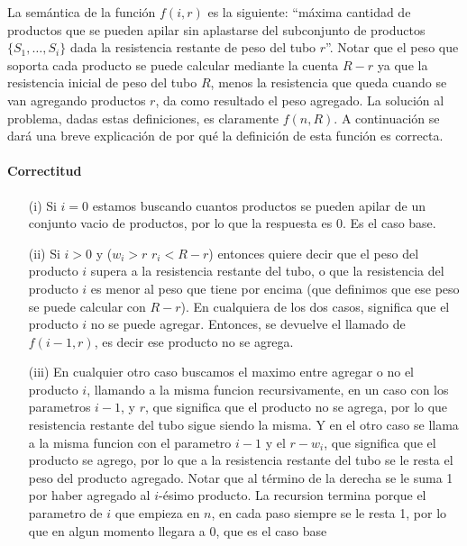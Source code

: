 \documentclass[10pt,a4paper]{article}
\begin{document}
La semántica de la función $f(i, r)$ es la siguiente: ``máxima cantidad de productos que se pueden apilar sin aplastarse del subconjunto de productos $\{S_1, \hdots, S_i\}$ dada la resistencia restante de peso del tubo $r$''. Notar que el peso que soporta cada producto se puede calcular mediante la cuenta $R-r$ ya que la resistencia inicial de peso del tubo $R$, menos la resistencia que queda cuando se van agregando productos $r$, da como resultado el peso agregado. La solución al problema, dadas estas definiciones, es claramente $f(n, R)$. A continuación se dará una breve explicación de por qué la definición de esta función es correcta.

\paragraph{Correctitud}
\begin{enumerate}
    \item[(i)] {Si $i = 0$ estamos buscando cuantos productos se pueden apilar de un conjunto vacio de productos, por lo que la respuesta es 0. Es el caso base.}
    \item[(ii)] {Si $i > 0$ y ($w_i > r$ \lor $r_i < R - r$) entonces quiere decir que el peso del producto $i$ supera a la resistencia restante del tubo, o que la resistencia del producto $i$ es menor al peso que tiene por encima (que definimos que ese peso se puede calcular con $R - r$). En cualquiera de los dos casos, significa que el producto $i$ no se puede agregar. Entonces, se devuelve el llamado de $f(i-1,r)$, es decir ese producto no se agrega.}
    \item[(iii)] { En cualquier otro caso buscamos el maximo entre agregar o no el producto $i$, llamando a la misma funcion recursivamente, en un caso con los parametros $i - 1$, y $r$, que significa que el producto no se agrega, por lo que resistencia restante del tubo sigue siendo la misma. Y en el otro caso se llama a la misma funcion con el parametro $i - 1$ y el $r - w_i$, que significa que el producto se agrego, por lo que a la resistencia restante del tubo se le resta el peso del producto agregado. Notar que al término de la derecha se le suma 1 por haber agregado al $i$-ésimo producto. La recursion termina porque el parametro de $i$ que empieza en $n$, en cada paso siempre se le resta 1, por lo que en algun momento llegara a 0, que es el caso base}
\end{enumerate}
\end{document}
